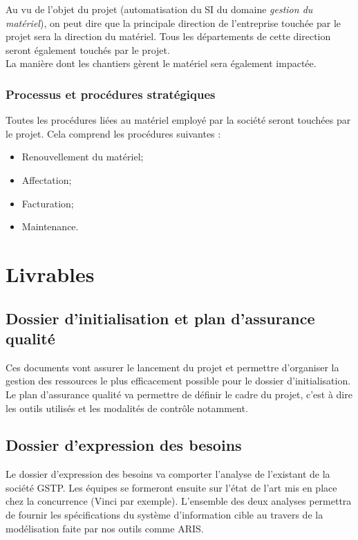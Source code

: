 \documentclass[twoside]{article}
\begin{document}
Au vu de l'objet du projet (automatisation du SI du domaine \textsl{gestion du
matériel}), on peut dire que la principale direction de l'entreprise touchée
par le projet sera la direction du matériel. Tous les départements de cette
direction seront également touchés par le projet.\\
La manière dont les chantiers gèrent le matériel sera également impactée.


\subsubsection{Processus et procédures stratégiques}

Toutes les procédures liées au matériel employé par la société seront
touchées par le projet. Cela comprend les procédures suivantes :
\begin{itemize}
\item Renouvellement du matériel;
\item Affectation;
\item Facturation;
\item Maintenance.
\end{itemize}



\section{Livrables}

\subsection{Dossier d'initialisation et plan d'assurance qualité}

Ces documents vont assurer le lancement du projet et permettre d'organiser
la gestion des ressources le plus efficacement possible pour le dossier d'initialisation.
Le plan d'assurance qualité va permettre de définir le cadre du projet, c'est à dire les outils utilisés et les modalités de contrôle notamment. 

\subsection{Dossier d'expression des besoins}

Le dossier d'expression des besoins va comporter l'analyse de l'existant
de la société GSTP. Les équipes se formeront ensuite sur l'état de l'art
mis en place chez la concurrence (Vinci par exemple). L'ensemble des deux
analyses permettra de fournir les spécifications du système d'information cible
au travers de la modélisation faite par nos outils comme ARIS. 
\end{document}

